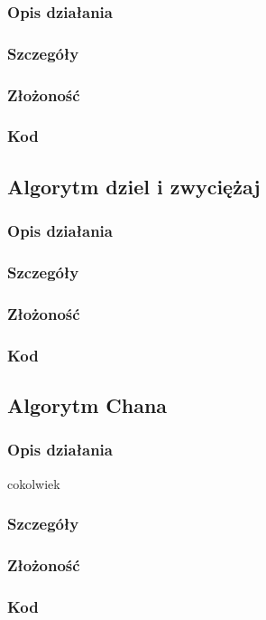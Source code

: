 \documentclass[11pt]{article}
\theoremstyle{remark} \newtheorem{definition}{def.}
\theoremstyle{definition} \newtheorem{twierdzenie}{tw.}
\begin{document}
    \subsubsection{Opis działania}
    \subsubsection{Szczegóły}
    \subsubsection{Złożoność}
    \subsubsection{Kod}

\newpage

\subsection{Algorytm dziel i zwyciężaj}
    \subsubsection{Opis działania}
    \subsubsection{Szczegóły}
    \subsubsection{Złożoność}
    \subsubsection{Kod}



\subsection{Algorytm Chana}
    \subsubsection{Opis działania}
    cokolwiek \cite{markdeberg}
    \subsubsection{Szczegóły}
    \subsubsection{Złożoność}
    \subsubsection{Kod}
    
    
    
    \medskip

\printbibliography
\end{document}
